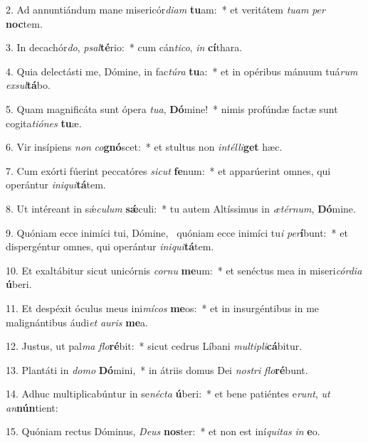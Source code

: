 2. Ad annuntiándum mane misericór\textit{di}\textit{am} \textbf{tu}am:~*  et veritátem \textit{tu}\textit{am} \textit{per} \textbf{noc}tem.\

3. In decachór\textit{do}, \textit{psal}\textbf{té}rio:~*  cum cán\textit{ti}\textit{co}, \textit{in} \textbf{cí}thara.\

4. Quia delectásti me, Dómine, in fac\textit{tú}\textit{ra} \textbf{tu}a:~*  et in opéribus mánuum tuá\textit{rum} \textit{ex}\textit{sul}\textbf{tá}bo.\

5. Quam magnificáta sunt ópera \textit{tu}\textit{a}, \textbf{Dó}mine!~*  nimis profúndæ factæ sunt cogita\textit{ti}\textit{ó}\textit{nes} \textbf{tu}æ.\

6. Vir insípiens \textit{non} \textit{co}\textbf{gnó}scet:~*  et stultus non \textit{in}\textit{tél}\textit{li}\textbf{get} hæc.\

7. Cum exórti fúerint peccatóres \textit{sic}\textit{ut} \textbf{fe}num:~*  et apparúerint omnes, qui operántur \textit{in}\textit{i}\textit{qui}\textbf{tá}tem.\

8. Ut intéreant in sǽ\textit{cu}\textit{lum} \textbf{sǽ}culi:~*  tu autem Altíssimus in \textit{æ}\textit{tér}\textit{num}, \textbf{Dó}mine.\

9. Quóniam ecce inimíci tui, Dómine, \dag\  quóniam ecce inimíci tu\textit{i} \textit{per}\textbf{í}bunt:~*  et dispergéntur omnes, qui operántur \textit{in}\textit{i}\textit{qui}\textbf{tá}tem.\

10. Et exaltábitur sicut unicórnis \textit{cor}\textit{nu} \textbf{me}um:~*  et senéctus mea in miseri\textit{cór}\textit{di}\textit{a} \textbf{ú}beri.\

11. Et despéxit óculus meus ini\textit{mí}\textit{cos} \textbf{me}os:~*  et in insurgéntibus in me malignántibus áudi\textit{et} \textit{au}\textit{ris} \textbf{me}a.\

12. Justus, ut pal\textit{ma} \textit{flo}\textbf{ré}bit:~*  sicut cedrus Líbani \textit{mul}\textit{ti}\textit{pli}\textbf{cá}bitur.\

13. Plantáti in \textit{do}\textit{mo} \textbf{Dó}mini,~*  in átriis domus Dei \textit{nos}\textit{tri} \textit{flo}\textbf{ré}bunt.\

14. Adhuc multiplicabúntur in se\textit{néc}\textit{ta} \textbf{ú}beri:~*  et bene patiéntes e\textit{runt}, \textit{ut} \textit{an}\textbf{nún}tient:\

15. Quóniam rectus Dóminus, \textit{De}\textit{us} \textbf{nos}ter:~*  et non est iní\textit{qui}\textit{tas} \textit{in} \textbf{e}o.\

